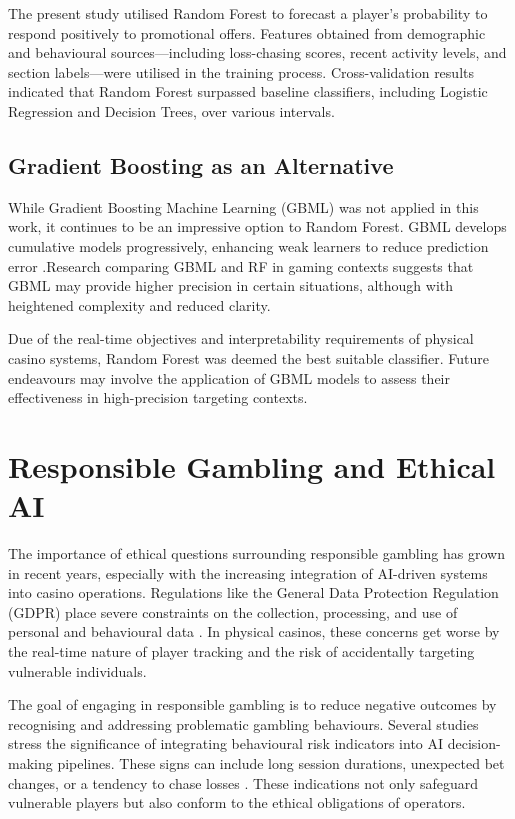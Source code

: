 \documentclass[12pt,a4paper]{report}
\begin{document}
The present study utilised Random Forest to forecast a player's probability to respond positively to promotional offers.  Features obtained from demographic and behavioural sources—including loss-chasing scores, recent activity levels, and section labels—were utilised in the training process.  Cross-validation results indicated that Random Forest surpassed baseline classifiers, including Logistic Regression and Decision Trees, over various intervals.

\subsection{Gradient Boosting as an Alternative}

While Gradient Boosting Machine Learning (GBML) was not applied in this work, it continues to be an impressive option to Random Forest.  GBML develops cumulative models progressively, enhancing weak learners to reduce prediction error \citep{Omike2022b}.Research comparing GBML and RF in gaming contexts suggests that GBML may provide higher precision in certain situations, although with heightened complexity and reduced clarity.

Due of the real-time objectives and interpretability requirements of physical casino systems, Random Forest was deemed the best suitable classifier.  Future endeavours may involve the application of GBML models to assess their effectiveness in high-precision targeting contexts.

\section{Responsible Gambling and Ethical AI}

The importance of ethical questions surrounding responsible gambling has grown in recent years, especially with the increasing integration of AI-driven systems into casino operations.  Regulations like the General Data Protection Regulation (GDPR) place severe constraints on the collection, processing, and use of personal and behavioural data \citep{gdpr2016}. In physical casinos, these concerns get worse by the real-time nature of player tracking and the risk of accidentally targeting vulnerable individuals.

The goal of engaging in responsible gambling is to reduce negative outcomes by recognising and addressing problematic gambling behaviours.  Several studies stress the significance of integrating behavioural risk indicators into AI decision-making pipelines. These signs can include long session durations, unexpected bet changes, or a tendency to chase losses \citep{Ladouceur2016, Priyadarshini2022}. These indications not only safeguard vulnerable players but also conform to the ethical obligations of operators.
\end{document}
